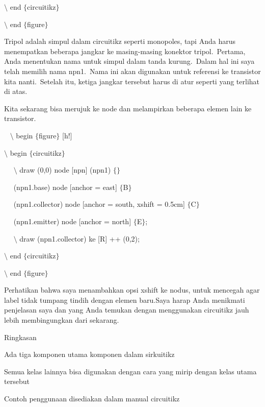 \noindent 
 $\setminus$ end $ \{ $circuitikz$ \} $
\par


\noindent 
 $\setminus$ end $ \{ $figure$ \} $ 
\par


\noindent 
Tripol adalah simpul dalam circuitikz seperti monopoles, tapi Anda harus menempatkan beberapa jangkar ke masing-masing konektor tripol. Pertama, Anda menentukan nama untuk simpul dalam tanda kurung. Dalam hal ini saya telah memilih nama npn1. Nama ini akan digunakan untuk referensi ke transistor kita nanti. Setelah itu, ketiga jangkar tersebut harus di atur seperti yang terlihat di atas.
\par


\noindent 
Kita sekarang bisa merujuk ke node dan melampirkan beberapa elemen lain ke transistor.
\par


\noindent 
~ $\setminus$ begin $ \{ $figure$ \} $ [h!]
\par


\noindent 
 $\setminus$ begin $ \{ $circuitikz$ \} $
\par


\noindent 
~~ $\setminus$ draw (0,0) node [npn] (npn1) $ \{ $$ \} $
\par


\noindent 
~~ (npn1.base) node [anchor = east] $ \{ $B$ \} $
\par


\noindent 
~~ (npn1.collector) node [anchor = south, xshift = 0.5cm] $ \{ $C$ \} $
\par


\noindent 
~~ (npn1.emitter) node [anchor = north] $ \{ $E$ \} $;
\par


\noindent 
~~ $\setminus$ draw (npn1.collector) ke [R] ++ (0,2);
\par


\noindent 
 $\setminus$ end $ \{ $circuitikz$ \} $
\par


\noindent 
 $\setminus$ end $ \{ $figure$ \} $ 
\par


\noindent 
Perhatikan bahwa saya menambahkan opsi xshift ke nodus, untuk mencegah agar label tidak tumpang tindih dengan elemen baru.Saya harap Anda menikmati penjelasan saya dan yang Anda temukan dengan menggunakan circuitikz jauh lebih membingungkan dari sekarang.
\par


\noindent 
Ringkasan
\par


\noindent 
Ada tiga komponen utama komponen dalam sirkuitikz
\par


\noindent 
Semua kelas lainnya bisa digunakan dengan cara yang mirip dengan kelas utama tersebut
\par


\noindent 
Contoh penggunaan disediakan dalam manual circuitikz
\par
